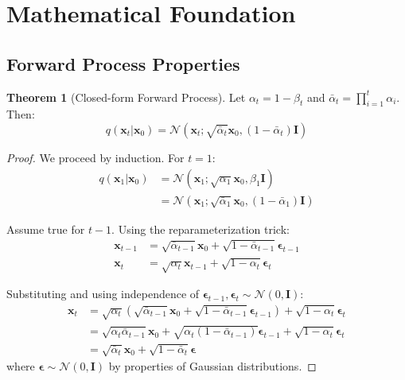 \documentclass[11pt,a4paper]{article}
\theoremstyle{definition}
\newtheorem{theorem}{Theorem}[section]
\newcommand{\N}{\mathcal{N}}
\begin{document}
\section{Mathematical Foundation}

\subsection{Forward Process Properties}

\begin{theorem}[Closed-form Forward Process]
    Let $\alpha_t = 1 - \beta_t$ and $\bar{\alpha}_t = \prod_{i=1}^t \alpha_i$. Then:
    \begin{equation}
        q(\mathbf{x}_t | \mathbf{x}_0) = \N(\mathbf{x}_t; \sqrt{\bar{\alpha}_t}\mathbf{x}_0, (1-\bar{\alpha}_t)\mathbf{I})
        \label{eq:forward_closed}
    \end{equation}
\end{theorem}

\begin{proof}
    We proceed by induction. For $t=1$:
    \begin{align}
        q(\mathbf{x}_1 | \mathbf{x}_0) &= \N(\mathbf{x}_1; \sqrt{\alpha_1}\mathbf{x}_0, \beta_1\mathbf{I}) \\
        &= \N(\mathbf{x}_1; \sqrt{\bar{\alpha}_1}\mathbf{x}_0, (1-\bar{\alpha}_1)\mathbf{I})
    \end{align}
    
    Assume true for $t-1$. Using the reparameterization trick:
    \begin{align}
        \mathbf{x}_{t-1} &= \sqrt{\bar{\alpha}_{t-1}}\mathbf{x}_0 + \sqrt{1-\bar{\alpha}_{t-1}}\bm{\epsilon}_{t-1} \\
        \mathbf{x}_t &= \sqrt{\alpha_t}\mathbf{x}_{t-1} + \sqrt{1-\alpha_t}\bm{\epsilon}_t
    \end{align}
    
    Substituting and using independence of $\bm{\epsilon}_{t-1}, \bm{\epsilon}_t \sim \N(0, \mathbf{I})$:
    \begin{align}
        \mathbf{x}_t &= \sqrt{\alpha_t}(\sqrt{\bar{\alpha}_{t-1}}\mathbf{x}_0 + \sqrt{1-\bar{\alpha}_{t-1}}\bm{\epsilon}_{t-1}) + \sqrt{1-\alpha_t}\bm{\epsilon}_t \\
        &= \sqrt{\alpha_t\bar{\alpha}_{t-1}}\mathbf{x}_0 + \sqrt{\alpha_t(1-\bar{\alpha}_{t-1})}\bm{\epsilon}_{t-1} + \sqrt{1-\alpha_t}\bm{\epsilon}_t \\
        &= \sqrt{\bar{\alpha}_t}\mathbf{x}_0 + \sqrt{1-\bar{\alpha}_t}\bm{\epsilon}
    \end{align}
    where $\bm{\epsilon} \sim \N(0, \mathbf{I})$ by properties of Gaussian distributions.
\end{proof}
\end{document}
